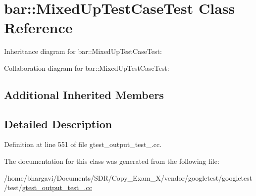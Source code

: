 \hypertarget{classbar_1_1_mixed_up_test_case_test}{}\section{bar\+:\+:Mixed\+Up\+Test\+Case\+Test Class Reference}
\label{classbar_1_1_mixed_up_test_case_test}


Inheritance diagram for bar\+:\+:Mixed\+Up\+Test\+Case\+Test\+:


Collaboration diagram for bar\+:\+:Mixed\+Up\+Test\+Case\+Test\+:
\subsection*{Additional Inherited Members}


\subsection{Detailed Description}


Definition at line 551 of file gtest\+\_\+output\+\_\+test\+\_\+.\+cc.



The documentation for this class was generated from the following file\+:\begin{DoxyCompactItemize}
\item 
/home/bhargavi/\+Documents/\+S\+D\+R/\+Copy\+\_\+\+Exam\+\_\+X/vendor/googletest/googletest/test/\hyperlink{gtest__output__test___8cc}{gtest\+\_\+output\+\_\+test\+\_\+.\+cc}\end{DoxyCompactItemize}
